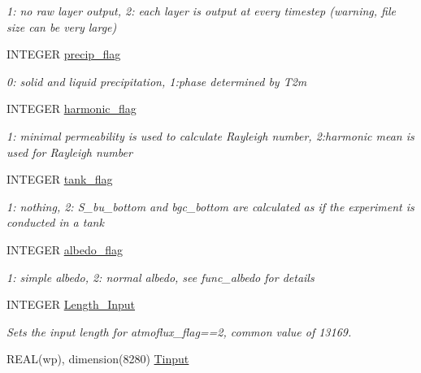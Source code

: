 \begin{DoxyCompactItemize}
\begin{DoxyCompactList}\small\item\em 1: no raw layer output, 2: each layer is output at every timestep (warning, file size can be very large) \item\end{DoxyCompactList}\item 
INTEGER \hyperlink{namespacemo__data_a466c2f829a8b266724dd9150cb99d42f}{precip\_\-flag}
\begin{DoxyCompactList}\small\item\em 0: solid and liquid precipitation, 1:phase determined by T2m \item\end{DoxyCompactList}\item 
INTEGER \hyperlink{namespacemo__data_a95ab71baf4d9fbae790e31780317af06}{harmonic\_\-flag}
\begin{DoxyCompactList}\small\item\em 1: minimal permeability is used to calculate Rayleigh number, 2:harmonic mean is used for Rayleigh number \item\end{DoxyCompactList}\item 
INTEGER \hyperlink{namespacemo__data_a20840603c089c697b8662ca2c45f23f3}{tank\_\-flag}
\begin{DoxyCompactList}\small\item\em 1: nothing, 2: S\_\-bu\_\-bottom and bgc\_\-bottom are calculated as if the experiment is conducted in a tank \item\end{DoxyCompactList}\item 
INTEGER \hyperlink{namespacemo__data_a503f12cf2d0684ad5423b92e37c97fbe}{albedo\_\-flag}
\begin{DoxyCompactList}\small\item\em 1: simple albedo, 2: normal albedo, see func\_\-albedo for details \item\end{DoxyCompactList}\item 
INTEGER \hyperlink{namespacemo__data_a9a0ff39379f1d347bcb323cd49cb222e}{Length\_\-Input}
\begin{DoxyCompactList}\small\item\em Sets the input length for atmoflux\_\-flag==2, common value of 13169. \item\end{DoxyCompactList}\item 
REAL(wp), dimension(8280) \hyperlink{namespacemo__data_a05dff3e3a302bd2f751263140d8f367b}{Tinput}

\end{DoxyCompactItemize}
